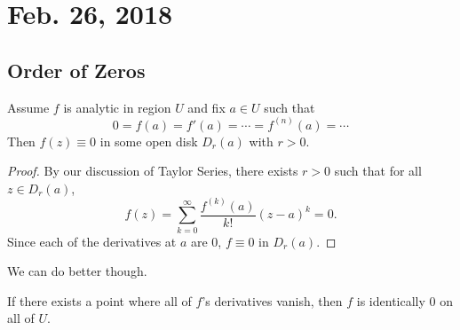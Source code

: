 \documentclass[notes]{subfile}
\begin{document}
\section{Feb. 26, 2018}

\subsection{Order of Zeros}

\begin{theorem}
    Assume $f$ is analytic in region $U$ and fix $a \in U$ such that
    \[ 0 = f(a) = f'(a) = \cdots = f^{(n)}(a) = \cdots \]
    Then $f(z) \equiv 0$ in some open disk $D_r(a)$ with
    $r > 0$.
\end{theorem}

\begin{proof}
    By our discussion of Taylor Series, there exists $r > 0$
    such that for all $z \in D_r(a)$,
    \[ f(z) = \sum_{k=0}^{\infty} \frac{f^{(k)}(a)}{k!}(z-a)^k
    = 0. \]
    Since each of the derivatives at $a$ are $0$, $f \equiv 0$ 
    in $D_r(a)$.
\end{proof}

We can do better though.

\begin{theorem}
    If there exists a point where all of $f$'s derivatives 
    vanish, then $f$ is identically $0$ on all of $U$.
\end{theorem}
\end{document}

